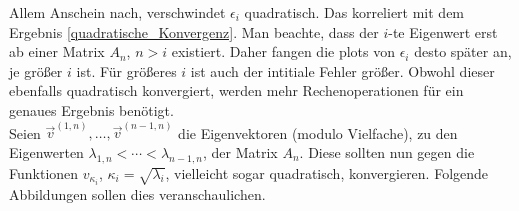 Allem Anschein nach, verschwindet $\epsilon_i$ quadratisch. Das korreliert mit dem Ergebnis \eqref{quadratische_Konvergenz}. Man beachte, dass der $i$-te Eigenwert erst ab einer Matrix $A_n$, $n > i$ existiert. Daher fangen die plots von $\epsilon_i$ desto später an, je größer $i$ ist. Für größeres $i$ ist auch der intitiale Fehler größer. Obwohl dieser ebenfalls quadratisch konvergiert, werden mehr Rechenoperationen für ein genaues Ergebnis benötigt. \\

Seien $\vec v^{(1, n)}, \ldots, \vec v^{(n-1, n)}$ die Eigenvektoren (modulo Vielfache), zu den Eigenwerten $\lambda_{1, n} < \cdots < \lambda_{n-1, n}$, der Matrix $A_n$. Diese sollten nun gegen die Funktionen $v_{\kappa_i}$, $\kappa_i = \sqrt{\lambda_i}$, vielleicht sogar quadratisch, konvergieren. Folgende Abbildungen sollen dies veranschaulichen.

